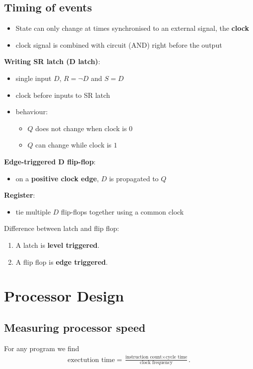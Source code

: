\documentclass{article}
\begin{document}
\subsection{Timing of events}
\begin{itemize}
	\item State can only change at times synchronised to an external signal, the \textbf{clock}
	\item clock signal is combined with circuit (AND) right before the output
\end{itemize}
\textbf{Writing SR latch (D latch)}:
\begin{itemize}
	\item single input $D$, $R=\neg D$ and $S=D$
	\item clock before inputs to SR latch
	\item behaviour: \begin{itemize}
		      \item $Q$ does not change when clock is $0$
		      \item $Q$ can change while clock is $1$
	      \end{itemize}
\end{itemize}
\textbf{Edge-triggered D flip-flop}:
\begin{itemize}
	\item on a \textbf{positive clock edge}, $D$ is propagated to $Q$
\end{itemize}
\textbf{Register}:
\begin{itemize}
	\item tie multiple $D$ flip-flops together using a common clock
\end{itemize}
\begin{definition}
	Difference between latch and flip flop:
	\begin{enumerate}
		\item A latch is \textbf{level triggered}.
		\item A flip flop is \textbf{edge triggered}.
	\end{enumerate}
\end{definition}
\section{Processor Design}
\subsection{Measuring processor speed}
\begin{theorem}
	\label{exectime}
	For any program we find
	\begin{align*}
		\text{exectution time}
		= \frac{\text{instruction count} \times \text{cycle time}}{\text{clock frequency}}.
	\end{align*}
\end{theorem}
\end{document}
